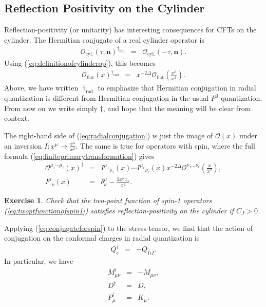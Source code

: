 \documentclass[11pt]{ws-rv9x6}
\newcommand\be{\begin{eqnarray}}
\newcommand\ee{\end{eqnarray}}
\newcommand\cO{\mathcal{O}}
\newcommand\p[1]{\left(#1\right)}
\newcommand\e\epsilon
\newcommand\<\langle
\renewcommand\>\rangle
\newcommand\de\delta
\newcommand\nn{\nonumber}
\renewcommand\.{\cdot}
\newcommand\De{\Delta}
\newcommand\bn{\mathbf{n}}
\newtheorem{exercise}{Exercise}[section]
\begin{document}
\subsection{Reflection Positivity on the Cylinder}

Reflection-positivity (or unitarity) has interesting consequences for CFTs on the cylinder.  The Hermitian conjugate of a real cylinder operator is
\be
\cO_\mathrm{cyl.}(\tau,\bn)^{\dag_\mathrm{rad}} &=& \cO_\mathrm{cyl.}(-\tau,\bn).
\ee
Using (\ref{eq:definitionofcylinderop}), this becomes
\be
\cO_\mathrm{flat}(x)^{\dag_\mathrm{rad}} &=& x^{-2\De}\cO_\mathrm{flat}\p{\frac{x^\mu}{x^2}}.\label{eq:radialconjugation}
\ee
Above, we have written $\dag_\mathrm{rad}$ to emphasize that Hermitian conjugation in radial quantization is different from Hermitian conjugation in the usual $P^0$ quantization.  From now on we write simply $\dag$, and hope that the meaning will be clear from context.

The right-hand side of (\ref{eq:radialconjugation}) is just the image of $\cO(x)$ under an inversion $I:x^\mu\to \frac{x^\mu}{x^2}$.  The same is true for operators with spin, where the full formula (\ref{eq:finiteprimarytransformation}) gives
\be
\label{eq:conjugateforspin}
\cO^{\mu_1\cdots\mu_\ell}(x)^\dag &=& I^{\mu_1}{}_{\nu_1}(x)\cdots I^{\mu_\ell}{}_{\nu_\ell}(x) x^{-2\De} \cO^{\nu_1\dots\nu_\ell}\p{\frac{x}{x^2}},\nn\\
I^\mu{}_\nu(x) &=& \de^\mu_\nu - \frac{2 x^\mu x_\nu}{x^2}.
\ee
\begin{exercise}
Check that the two-point function of spin-1 operators (\ref{eq:twoptfunctionofspin1}) satisfies reflection-positivity on the cylinder if $C_J>0$.
\end{exercise}
Applying (\ref{eq:conjugateforspin}) to the stress tensor, we find that 
 the action of conjugation on the conformal charges in radial quantization is
\be
Q_\e^\dag &=& -Q_{I\e I}.
\ee
In particular, we have
\be
\label{eq:mantihermitian}
M_{\mu\nu}^\dag &=& -M_{\mu\nu},\nn\\
D^\dag &=& D,\nn\\
P_\mu^\dag &=& K_\mu.
\ee
\end{document}
